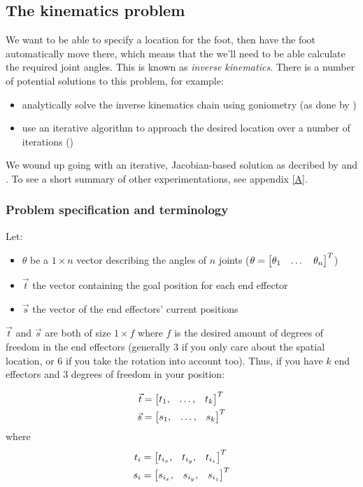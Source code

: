 \documentclass[a4paper]{article}
\begin{document}
\subsection{The kinematics problem}
\label{sec:ik}
We want to be able to specify a location for the foot, then have the foot
automatically move there, which means that the we'll need to be able calculate
the required joint angles. This is known as \emph{inverse kinematics}. There is
a number of potential solutions to this problem, for example: 
\begin{itemize}
\item analytically solve the inverse kinematics chain using goniometry (as done by \cite{Graf2009})
\item use an iterative algorithm to approach the desired location over a number
  of iterations (\cite{Buss2009})
\end{itemize}

We wound up going with an iterative, Jacobian-based solution as decribed by
\cite{Meredith2004} and \cite{Buss2009}. To see a short summary of other
experimentations, see appendix \ref{A}.

\subsubsection{Problem specification and terminology}
Let:
\begin{itemize}
    \item $\theta$ be a $1 \times n$ vector describing the angles of $n$ joints
        ($\theta = \begin{bmatrix} \theta_1 & \dots & \theta_n \end{bmatrix}^T$)
    \item $\vec{t}$ the vector containing the goal position for each end effector
    \item $\vec{s}$ the vector of the end effectors' current positions
\end{itemize}

$\vec{t}$ and $\vec{s}$ are both of size $1 \times f$ where $f$ is the
desired amount of degrees of freedom in the end effectors (generally 3
if you only care about the spatial location, or 6 if you take the
rotation into account too).  Thus, if you have $k$ end effectors and 3
degrees of freedom in your position:

\begin{align*}
    \vec{t} &= \begin{bmatrix} t_1, &\dots, &t_k \end{bmatrix}^T \\
    \vec{s} &= \begin{bmatrix} s_1, &\dots, &s_k \end{bmatrix}^T
\end{align*}
where
\begin{align*}
    t_i &= \begin{bmatrix} t_{i_{x}}, &t_{i_{y}}, &t_{i_{z}} \end{bmatrix}^T \\
    s_i &= \begin{bmatrix} s_{i_{x}}, &s_{i_{y}}, &s_{i_{z}} \end{bmatrix}^T
\end{align*}
\end{document}
